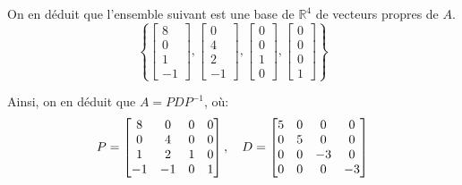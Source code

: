 \documentclass[a4paper]{article}
\begin{document}
{    On en déduit que l'ensemble suivant est une base de $\mathbb{R}^4$ de vecteurs propres de $A$.
    \[\left\{\begin{bmatrix} 8 \\ 0 \\ 1 \\ -1 \end{bmatrix}, \begin{bmatrix} 0 \\ 4 \\ 2 \\ -1 \end{bmatrix}, \begin{bmatrix} 0 \\ 0 \\ 1 \\ 0 \end{bmatrix}, \begin{bmatrix} 0 \\ 0 \\ 0 \\ 1 \end{bmatrix} \right\}\]

    Ainsi, on en déduit que $A = PDP^{-1}$, où:
    \[P = \begin{bmatrix} 8 & 0 & 0 & 0 \\ 0 & 4 & 0 & 0 \\ 1 & 2 & 1 & 0 \\ -1 & -1 & 0 & 1 \end{bmatrix}, \quad D = \begin{bmatrix} 5 & 0 & 0 & 0 \\ 0 & 5 & 0 & 0 \\ 0 & 0 & -3 & 0 \\ 0 & 0 & 0 & -3 \end{bmatrix} \]
}
\end{document}
